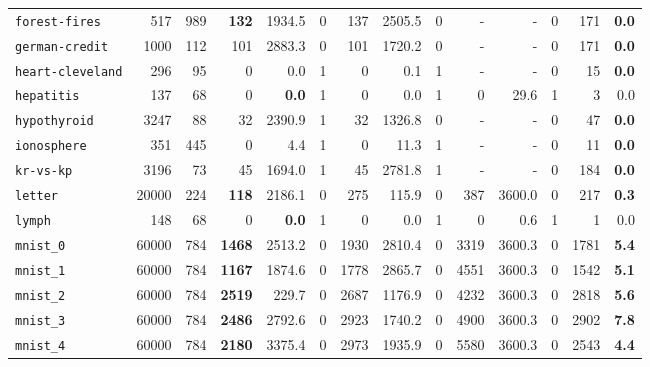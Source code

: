 \begin{tabular}{lccrrrrrrrrrrr}
\texttt{forest-fires} & \multicolumn{1}{r}{517} & \multicolumn{1}{r}{989}  & \textbf{132} & 1934.5 & 0 & 137 & 2505.5 & 0 & - & - & 0 & 171 & \textbf{0.0}\\
\texttt{german-credit} & \multicolumn{1}{r}{1000} & \multicolumn{1}{r}{112}  & 101 & 2883.3 & 0 & 101 & 1720.2 & 0 & - & - & 0 & 171 & \textbf{0.0}\\
\texttt{heart-cleveland} & \multicolumn{1}{r}{296} & \multicolumn{1}{r}{95}  & 0 & 0.0 & 1 & 0 & 0.1 & 1 & - & - & 0 & 15 & \textbf{0.0}\\
\texttt{hepatitis} & \multicolumn{1}{r}{137} & \multicolumn{1}{r}{68}  & 0 & \textbf{0.0} & 1 & 0 & 0.0 & 1 & 0 & 29.6 & 1 & 3 & 0.0\\
\texttt{hypothyroid} & \multicolumn{1}{r}{3247} & \multicolumn{1}{r}{88}  & 32 & 2390.9 & 1 & 32 & 1326.8 & 0 & - & - & 0 & 47 & \textbf{0.0}\\
\texttt{ionosphere} & \multicolumn{1}{r}{351} & \multicolumn{1}{r}{445}  & 0 & 4.4 & 1 & 0 & 11.3 & 1 & - & - & 0 & 11 & \textbf{0.0}\\
\texttt{kr-vs-kp} & \multicolumn{1}{r}{3196} & \multicolumn{1}{r}{73}  & 45 & 1694.0 & 1 & 45 & 2781.8 & 1 & - & - & 0 & 184 & \textbf{0.0}\\
\texttt{letter} & \multicolumn{1}{r}{20000} & \multicolumn{1}{r}{224}  & \textbf{118} & 2186.1 & 0 & 275 & 115.9 & 0 & 387 & 3600.0 & 0 & 217 & \textbf{0.3}\\
\texttt{lymph} & \multicolumn{1}{r}{148} & \multicolumn{1}{r}{68}  & 0 & \textbf{0.0} & 1 & 0 & 0.0 & 1 & 0 & 0.6 & 1 & 1 & 0.0\\
\texttt{mnist\_0} & \multicolumn{1}{r}{60000} & \multicolumn{1}{r}{784}  & \textbf{1468} & 2513.2 & 0 & 1930 & 2810.4 & 0 & 3319 & 3600.3 & 0 & 1781 & \textbf{5.4}\\
\texttt{mnist\_1} & \multicolumn{1}{r}{60000} & \multicolumn{1}{r}{784}  & \textbf{1167} & 1874.6 & 0 & 1778 & 2865.7 & 0 & 4551 & 3600.3 & 0 & 1542 & \textbf{5.1}\\
\texttt{mnist\_2} & \multicolumn{1}{r}{60000} & \multicolumn{1}{r}{784}  & \textbf{2519} & 229.7 & 0 & 2687 & 1176.9 & 0 & 4232 & 3600.3 & 0 & 2818 & \textbf{5.6}\\
\texttt{mnist\_3} & \multicolumn{1}{r}{60000} & \multicolumn{1}{r}{784}  & \textbf{2486} & 2792.6 & 0 & 2923 & 1740.2 & 0 & 4900 & 3600.3 & 0 & 2902 & \textbf{7.8}\\
\texttt{mnist\_4} & \multicolumn{1}{r}{60000} & \multicolumn{1}{r}{784}  & \textbf{2180} & 3375.4 & 0 & 2973 & 1935.9 & 0 & 5580 & 3600.3 & 0 & 2543 & \textbf{4.4}\\

\end{tabular}
